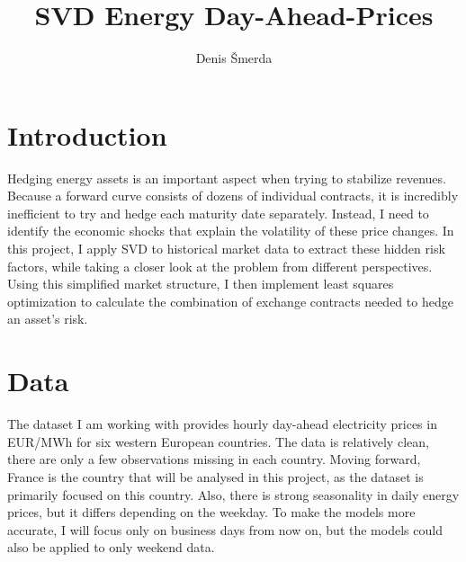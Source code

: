 \documentclass{article}
\begin{document}

\title{SVD Energy Day-Ahead-Prices}
\date{}
\author{Denis Šmerda}
\maketitle

\section*{Introduction}
Hedging energy assets is an important aspect when trying to stabilize revenues.
Because a forward curve consists of dozens of individual contracts, it is incredibly inefficient to try and hedge each maturity date separately.
Instead, I need to identify the economic shocks that explain the volatility of these price changes.
In this project, I apply SVD to historical market data to extract these hidden risk factors, while taking a closer look at the problem from different perspectives.
Using this simplified market structure, I then implement least squares optimization to calculate the combination of exchange contracts needed to hedge an asset's risk.

\section{Data}
The dataset I am working with provides hourly day-ahead electricity prices in EUR/MWh for six western European countries.
The data is relatively clean, there are only a few observations missing in each country.
Moving forward, France is the country that will be analysed in this project, as the dataset is primarily focused on this country.
Also, there is strong seasonality in daily energy prices, but it differs depending on the weekday.
To make the models more accurate, I will focus only on business days from now on, but the models could also be applied to only weekend data.
\end{document}
